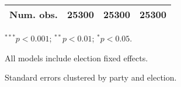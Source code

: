 \begin{table}
\begin{center}
\begin{threeparttable}
\begin{tabular}{l D{.}{.}{6.6} D{.}{.}{6.6} D{.}{.}{6.6}}
Num. obs.                          & 25300       & 25300       & 25300        \\
\bottomrule
\end{tabular}
\begin{tablenotes}[flushleft]
\scriptsize{\item $^{***}p<0.001$; $^{**}p<0.01$; $^{*}p<0.05$. \item All models include election fixed effects. \item Standard errors clustered by party and election.}
\end{tablenotes}
\end{threeparttable}
\label{tab:regression_coefficients_subset}
\end{center}
\end{table}
